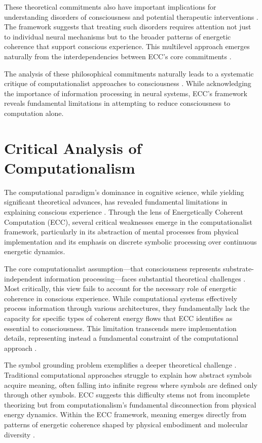 \begin{refsection}
These theoretical commitments also have important implications for understanding disorders of consciousness and potential therapeutic interventions \cite{thompson2007mind}. The framework suggests that treating such disorders requires attention not just to individual neural mechanisms but to the broader patterns of energetic coherence that support conscious experience. This multilevel approach emerges naturally from the interdependencies between ECC's core commitments \cite{dennett2017from}.

The analysis of these philosophical commitments naturally leads to a systematic critique of computationalist approaches to consciousness \cite{di2017sensorimotor}. While acknowledging the importance of information processing in neural systems, ECC's framework reveals fundamental limitations in attempting to reduce consciousness to computation alone.

\section{Critical Analysis of Computationalism}

The computational paradigm's dominance in cognitive science, while yielding significant theoretical advances, has revealed fundamental limitations in explaining conscious experience \cite{piccinini2015physical}. Through the lens of Energetically Coherent Computation (ECC), several critical weaknesses emerge in the computationalist framework, particularly in its abstraction of mental processes from physical implementation and its emphasis on discrete symbolic processing over continuous energetic dynamics.

The core computationalist assumption—that consciousness represents substrate-independent information processing—faces substantial theoretical challenges \cite{fodor2000mind}. Most critically, this view fails to account for the necessary role of energetic coherence in conscious experience. While computational systems effectively process information through various architectures, they fundamentally lack the capacity for specific types of coherent energy flows that ECC identifies as essential to consciousness. This limitation transcends mere implementation details, representing instead a fundamental constraint of the computational approach \cite{dreyfus1972what}.

The symbol grounding problem exemplifies a deeper theoretical challenge \cite{harnad1990symbol}. Traditional computational approaches struggle to explain how abstract symbols acquire meaning, often falling into infinite regress where symbols are defined only through other symbols. ECC suggests this difficulty stems not from incomplete theorizing but from computationalism's fundamental disconnection from physical energy dynamics. Within the ECC framework, meaning emerges directly from patterns of energetic coherence shaped by physical embodiment and molecular diversity \cite{bickhard1995foundational}.


\end{refsection}
